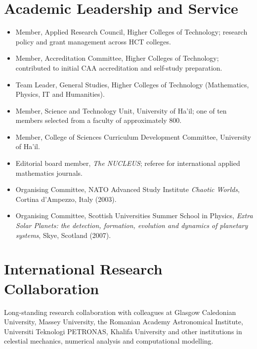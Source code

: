 \documentclass[10pt,a4paper]{article}
\begin{document}
\section{Academic Leadership and Service}
\begin{itemize}
\item Member, Applied Research Council, Higher Colleges of Technology; research policy and grant management across HCT colleges.
\item Member, Accreditation Committee, Higher Colleges of Technology; contributed to initial CAA accreditation and self-study preparation.
\item Team Leader, General Studies, Higher Colleges of Technology (Mathematics, Physics, IT and Humanities).
\item Member, Science and Technology Unit, University of Ha'il; one of ten members selected from a faculty of approximately 800.
\item Member, College of Sciences Curriculum Development Committee, University of Ha'il.
\item Editorial board member, \textit{The NUCLEUS}; referee for international applied mathematics journals.
\item Organising Committee, NATO Advanced Study Institute \textit{Chaotic Worlds}, Cortina d'Ampezzo, Italy (2003).
\item Organising Committee, Scottish Universities Summer School in Physics, \textit{Extra Solar Planets: the detection, formation, evolution and dynamics of planetary systems}, Skye, Scotland (2007).
\end{itemize}

\section{International Research Collaboration}
Long-standing research collaboration with colleagues at Glasgow Caledonian University, Massey University, the Romanian Academy Astronomical Institute, Universiti Teknologi PETRONAS, Khalifa University and other institutions in celestial mechanics, numerical analysis and computational modelling.

\end{document}
